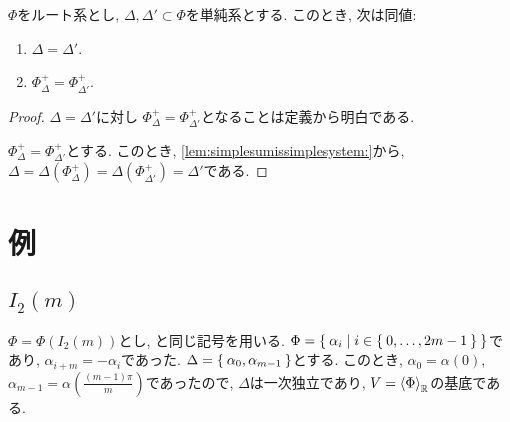 \begin{theorem}
  $\Phi$をルート系とし,
  $\Delta,\Delta'\subset \Phi$を単純系とする.
  このとき, 次は同値:
  \begin{enumerate}
  \item $\Delta=\Delta'$.
  \item $\Phi_\Delta^+=\Phi_{\Delta'}^+$.
  \end{enumerate}
\end{theorem}
\begin{proof}
  $\Delta=\Delta'$に対し
  $\Phi_\Delta^+=\Phi_{\Delta'}^+$となることは定義から明白である.

  $\Phi_\Delta^+=\Phi_{\Delta'}^+$とする.
  このとき,
  \cref{lem:simplesumissimplesystem:}から,
  $\Delta=\Delta(\Phi_\Delta^+)=\Delta(\Phi_{\Delta'}^+)=\Delta'$である.

\end{proof}

\section{例}

\subsection{$I_2(m)$}
\label{ex:i2m:simple}
$\Phi=\Phi(I_2(m))$とし,
と同じ記号を用いる.
$\Phi=\Set{\alpha_i|i\in\Set{0,\ldots,2m-1}}$であり, $\alpha_{i+m}=-\alpha_i$であった.
$\Delta=\Set{\alpha_0,\alpha_{m-1}}$とする.
このとき,
$\alpha_{0}=\alpha(0)$, $\alpha_{m-1}=\alpha(\frac{(m-1)\pi}{m})$であったので,
$\Delta$は一次独立であり, $V=\Braket{\Phi}_{\mathbb{R}}$の基底である.

